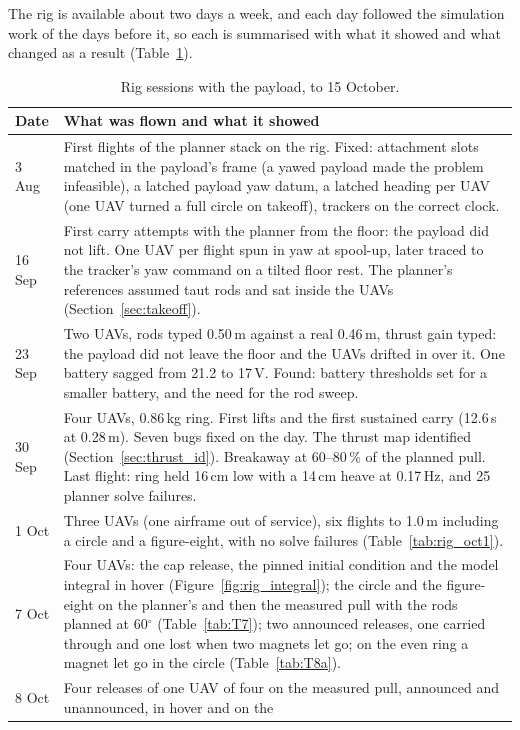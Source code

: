 The rig is available about two days a week, and each day followed the simulation work of the days
before it, so each is summarised with what it showed and what changed as a result
(Table~\ref{tab:rig_days}).

\begin{table}[h]
\centering
\small
\caption{Rig sessions with the payload, to 15 October.}
\label{tab:rig_days}
\begin{tabularx}{\textwidth}{lX}
\toprule
Date & What was flown and what it showed \\
\midrule
3 Aug & First flights of the planner stack on the rig. Fixed: attachment slots matched in the
payload's frame (a yawed payload made the problem infeasible), a latched payload yaw datum, a latched
heading per UAV (one UAV turned a full circle on takeoff), trackers on the correct clock. \\
16 Sep & First carry attempts with the planner from the floor: the payload did not lift. One UAV per
flight spun in yaw at spool-up, later traced to the tracker's yaw command on a tilted floor rest. The planner's references assumed taut rods and sat inside
the UAVs (Section~\ref{sec:takeoff}). \\
23 Sep & Two UAVs, rods typed 0.50\,m against a real 0.46\,m, thrust gain typed: the payload did not
leave the floor and the UAVs drifted in over it. One battery sagged from 21.2 to 17\,V. Found: battery
thresholds set for a smaller battery, and the need for the rod sweep. \\
30 Sep & Four UAVs, 0.86\,kg ring. First lifts and the first sustained carry (12.6\,s at 0.28\,m). Seven
bugs fixed on the day. The thrust map identified (Section~\ref{sec:thrust_id}). Breakaway at 60--80\,\%
of the planned pull. Last flight: ring held 16\,cm low with a 14\,cm heave at 0.17\,Hz, and 25 planner
solve failures. \\
1 Oct & Three UAVs (one airframe out of service), six flights to 1.0\,m including a circle and a
figure-eight, with no solve failures (Table~\ref{tab:rig_oct1}). \\
7 Oct & Four UAVs: the cap release, the pinned initial condition and the model integral in hover
(Figure~\ref{fig:rig_integral}); the circle and the figure-eight on the planner's and then the measured pull with
the rods planned at 60$^\circ$ (Table~\ref{tab:T7}); two announced releases, one carried through and one lost when two
magnets let go; on the even ring a magnet let go in the circle (Table~\ref{tab:T8a}). \\
8 Oct & Four releases of one UAV of four on the measured pull, announced and unannounced, in hover and on the

\end{tabularx}
\end{table}
